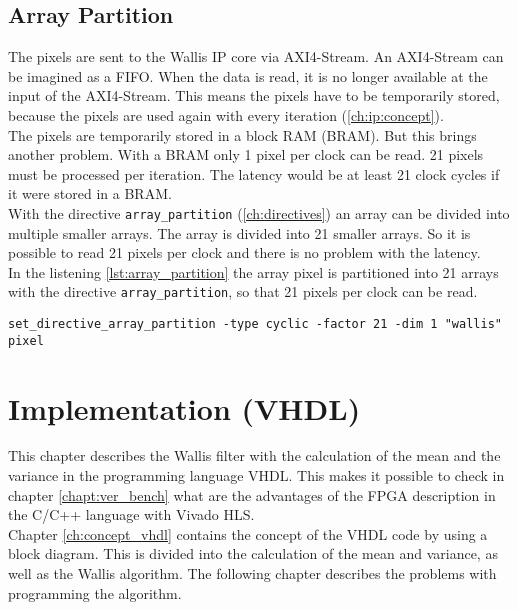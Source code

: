 \subsection{Array Partition}
The pixels are sent to the Wallis IP core via AXI4-Stream. An AXI4-Stream can be imagined as a FIFO. When the data is read, it is no longer available at the input of the AXI4-Stream. This means the pixels have to be temporarily stored, because the pixels are used again with every iteration (\ref{ch:ip:concept}). \\
The pixels are temporarily stored in a block RAM (BRAM). But this brings another problem. With a BRAM only 1 pixel per clock can be read. 21 pixels must be processed per iteration. The latency would be at least 21 clock cycles if it were stored in a BRAM. \\
With the directive \texttt{array\_partition} (\ref{ch:directives}) an array can be divided into multiple smaller arrays. The array is divided into 21 smaller arrays. So it is possible to read 21 pixels per clock and there is no problem with the latency. \\
In the listening \ref{lst:array_partition} the array pixel is partitioned into 21 arrays with the directive \texttt{array\_partition}, so that 21 pixels per clock can be read. 

\begin{minipage}{\textwidth}
\begin{lstlisting}[style=TextStyle, caption=Set directive array\_partition, label=lst:array_partition]
set_directive_array_partition -type cyclic -factor 21 -dim 1 "wallis" pixel
\end{lstlisting}
\end{minipage}



\section{Implementation (VHDL)} \label{ch:ip:imp_vhdl}
This chapter describes the Wallis filter with the calculation of the mean and the variance in the programming language VHDL. This makes it possible to check in chapter \ref{chapt:ver_bench} what are the advantages of the FPGA description in the C/C++ language with Vivado HLS. \\
Chapter \ref{ch:concept_vhdl} contains the concept of the VHDL code by using a block diagram. This is divided into the calculation of the mean and variance, as well as the Wallis algorithm. The following chapter describes the problems with programming the algorithm.

